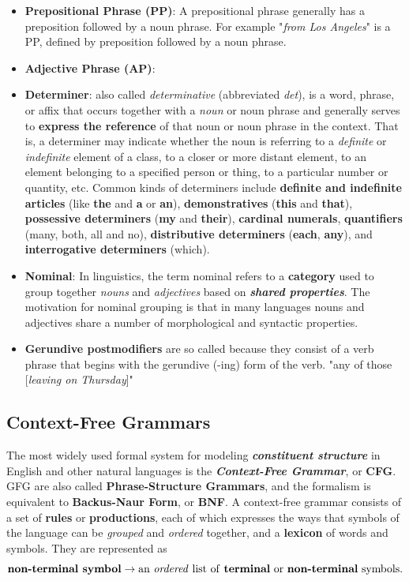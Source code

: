 \documentclass[11pt]{article}
\begin{document}
\begin{itemize}
\item \textbf{Prepositional Phrase (PP)}: A prepositional phrase generally has a preposition followed by a noun phrase. For example "\emph{from Los Angeles}" is a PP, defined by preposition followed by a noun phrase. 
\item \textbf{Adjective Phrase (AP)}: 
\item \textbf{Determiner}:  also called \emph{determinative} (abbreviated \emph{det}), is a word, phrase, or affix that occurs together with a \emph{noun} or noun phrase and generally serves to \textbf{express the reference} of that noun or noun phrase in the context. That is, a determiner may indicate whether the noun is referring to a \emph{definite} or \emph{indefinite} element of a class, to a closer or more distant element, to an element belonging to a specified person or thing, to a particular number or quantity, etc. Common kinds of determiners include \textbf{definite and indefinite articles} (like \textbf{the} and \textbf{a} or \textbf{an}), \textbf{demonstratives} (\textbf{this} and \textbf{that}), \textbf{possessive determiners} (\textbf{my} and \textbf{their}), \textbf{cardinal numerals}, \textbf{quantifiers} (many, both, all and no), \textbf{distributive determiners} (\textbf{each}, \textbf{any}), and \textbf{interrogative determiners} (which). 
\item \textbf{Nominal}:  In linguistics, the term nominal refers to a \textbf{category} used to group together \emph{nouns} and \emph{adjectives} based on \emph{\textbf{shared properties}}. The motivation for nominal grouping is that in many languages nouns and adjectives share a number of morphological and syntactic properties.  
\item \textbf{Gerundive postmodifiers} are so called because they consist of a verb phrase that begins with the gerundive (-ing) form of the verb. "any of those [\emph{leaving on Thursday}]"
\end{itemize} 


\subsection{Context-Free Grammars}
The most widely used formal system for modeling \emph{\textbf{constituent structure}} in English and other natural languages is the \textbf{\emph{Context-Free Grammar}}, or \textbf{CFG}. GFG are also called \textbf{Phrase-Structure Grammars}, and the formalism is equivalent to \textbf{Backus-Naur Form}, or \textbf{BNF}. A context-free grammar consists of a set of \textbf{rules} or \textbf{productions}, each of which expresses the ways that symbols of the language can be \emph{grouped} and \emph{ordered} together, and a \textbf{lexicon} of words and symbols. They are represented as 
$$ \text{\textbf{non-terminal symbol}} \rightarrow \text{an \emph{ordered} list of \textbf{terminal} or \textbf{non-terminal} symbols}.$$
\end{document}
